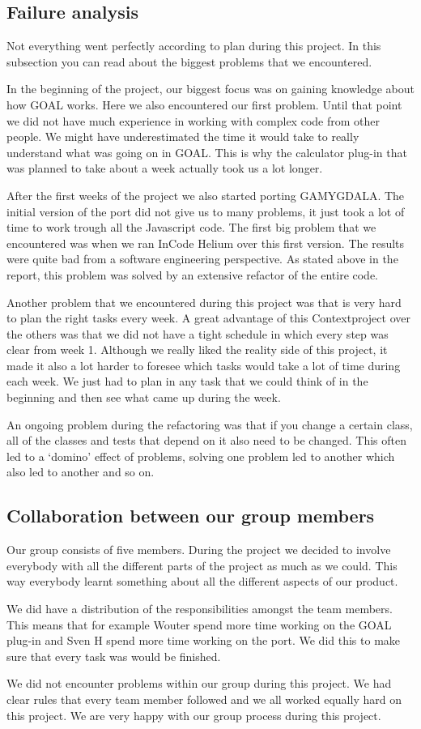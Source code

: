 \subsection{Failure analysis}
Not everything went perfectly according to plan during this project. In this subsection you can read about the biggest problems that we encountered. \par 
In the beginning of the project, our biggest focus was on gaining knowledge about how GOAL works. Here we also encountered our first problem. Until that point we did not have much experience in working with complex code from other people. We might have underestimated the time it would take to really understand what was going on in GOAL. This is why the calculator plug-in that was planned to take about a week actually took us a lot longer. \par
After the first weeks of the project we also started porting GAMYGDALA. The initial version of the port did not give us to many problems, it just took a lot of time to work trough all the Javascript code. The first big problem that we encountered was when we ran InCode Helium \citep{incode} over this first version. The results were quite bad from a software engineering perspective. As stated above in the report, this problem was solved by an extensive refactor of the entire code. \par
Another problem that we encountered during this project was that is very hard to plan the right tasks every week. A great advantage of this Contextproject over the others was that we did not have a tight schedule in which every step was clear from week 1. Although we really liked the reality side of this project, it made it also a lot harder to foresee which tasks would take a lot of time during each week. We just had to plan in any task that we could think of in the beginning and then see what came up during the week. \par
An ongoing problem during the refactoring was that if you change a certain class, all of the classes and tests that depend on it also need to be changed. This often led to a `domino' effect of problems, solving one problem led to another which also led to another and so on.

\subsection{Collaboration between our group members}
Our group consists of five members. During the project we decided to involve everybody with all the different parts of the project as much as we could. This way everybody learnt something about all the different aspects of our product. \par
We did have a distribution of the responsibilities amongst the team members. This means that for example Wouter spend more time working on the GOAL plug-in and Sven H spend more time working on the port. We did this to make sure that every task was would be finished. \par
We did not encounter problems within our group during this project. We had clear rules that every team member followed and we all worked equally hard on this project. We are very happy with our group process during this project.

